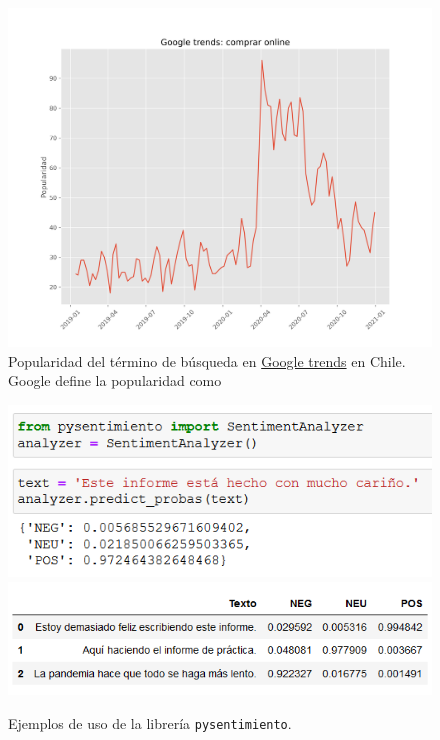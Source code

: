 \documentclass{article}
\begin{document}
\begin{figure}[H]
	\centering
	\includegraphics[scale=.42]{imgs/google_trend_compra_online.png}
	\caption{Popularidad del término de búsqueda  en \href{https://trends.google.es/trends/?geo=CL}{Google trends} en Chile. Google define la popularidad como }
	\label{fig:google_trend_compra_online}
\end{figure}
\begin{figure}[H]
	\centering
	\includegraphics[scale=.65]{imgs/pysentimiento_example.png}
	\vspace{.5cm}
	\includegraphics[scale=.65]{imgs/pysentimiento_example2.png}
	\caption{Ejemplos de uso de la librería \texttt{pysentimiento}.}
	\label{fig:pysentimiento_example}
\end{figure}
\end{document}
